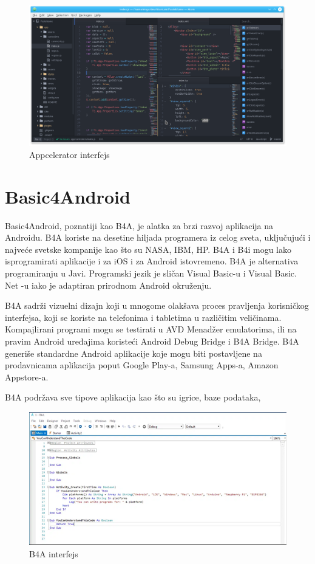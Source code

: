 \documentclass[12pt]{article}
\begin{document}
\begin{figure}[ht!]
    \centering
    \includegraphics[scale=0.3]{Appcelerator.png}
    \caption{Appcelerator interfejs}
\end{figure}

\section{Basic4Android}
Basic4Android, poznatiji kao B4A, je alatka za brzi razvoj aplikacija na Androidu. B4A koriste na desetine hiljada programera iz celog sveta, uključujući i najveće svetske kompanije kao što su NASA, IBM, HP.
B4A i B4i mogu lako isprogramirati aplikacije i za iOS i za Android istovremeno. B4A je alternativa programiranju u Javi. Programski jezik je sličan Visual Basic-u i Visual Basic. Net -u iako je adaptiran prirodnom Android okruženju.

B4A sadrži vizuelni dizajn koji u mnogome olakšava proces pravljenja korisničkog interfejsa, koji se koriste na telefonima i tabletima u različitim veličinama. Kompajlirani programi mogu se testirati u AVD Menadžer emulatorima, ili na pravim Android uređajima koristeći Android Debug Bridge i B4A Bridge. 
B4A generiše standardne Android aplikacije koje mogu biti postavljene na prodavnicama aplikacija poput Google Play-a, Samsung Apps-a, Amazon Appstore-a.

B4A podržava sve tipove aplikacija kao što su igrice, baze podataka, 
\begin{figure}[ht!]
    \centering
    \includegraphics[scale=0.9]{b4aslika.png}
    \caption{B4A interfejs}
\end{figure}
\end{document}
